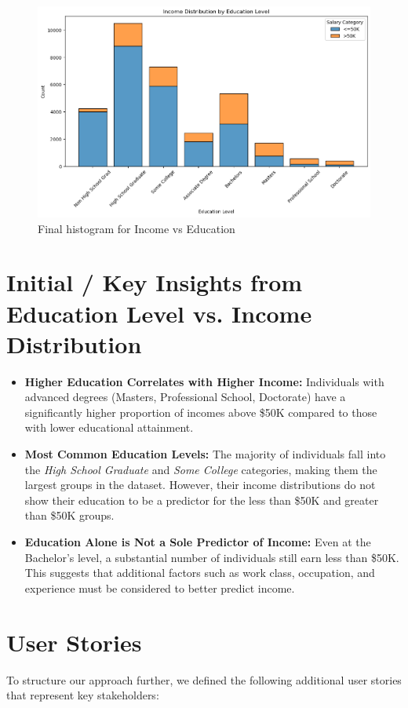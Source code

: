 \documentclass[journal,onecolumn]{IEEEtran}
\begin{document}
\begin{figure}[t]
    \centering
    \includegraphics[width=0.9\linewidth]{hist_4.png}  %
    \caption{Final histogram for Income vs Education}
    \label{fig:final_income_vs_education}
\end{figure}
\section{Initial / Key Insights from Education Level vs. Income Distribution}

\begin{itemize}
    \item \textbf{Higher Education Correlates with Higher Income:} Individuals with advanced degrees (Masters, Professional School, Doctorate) have a significantly higher proportion of incomes above \$50K compared to those with lower educational attainment.
    
    \item \textbf{Most Common Education Levels:} The majority of individuals fall into the \textit{High School Graduate} and \textit{Some College} categories, making them the largest groups in the dataset. However, their income distributions do not show their education to be a predictor for the less than \$50K and greater than \$50K groups.
    
    \item \textbf{Education Alone is Not a Sole Predictor of Income:} Even at the Bachelor's level, a substantial number of individuals still earn less than \$50K. This suggests that additional factors such as work class, occupation, and experience must be considered to better predict income.
\end{itemize}


\section{User Stories}
To structure our approach further, we defined the following additional user stories that represent key stakeholders:
\end{document}

